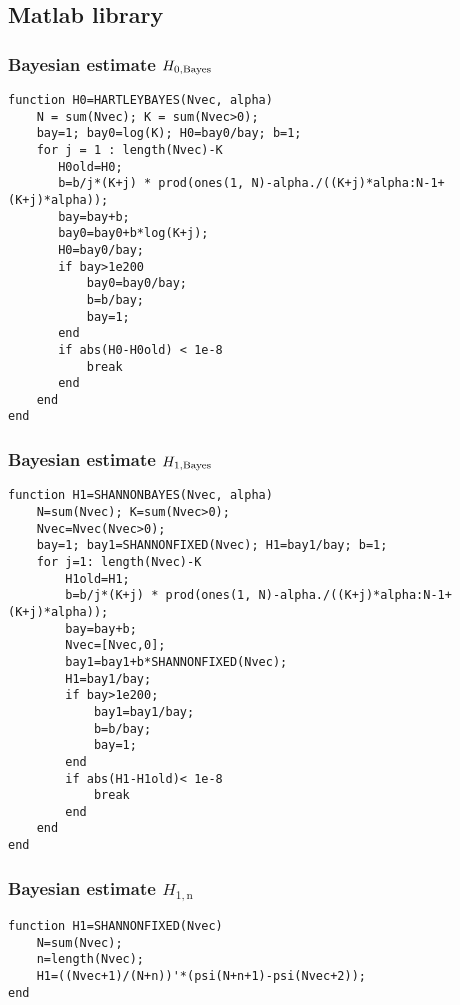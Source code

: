 \subsection{Matlab library}

\subsubsection{Bayesian estimate $ H_{0,\mbox{\scriptsize{Bayes}}}$ }
\ttfamily
\begin{lstlisting}
function H0=HARTLEYBAYES(Nvec, alpha) 
    N = sum(Nvec); K = sum(Nvec>0);        
    bay=1; bay0=log(K); H0=bay0/bay; b=1;
    for j = 1 : length(Nvec)-K
       H0old=H0;   
       b=b/j*(K+j) * prod(ones(1, N)-alpha./((K+j)*alpha:N-1+(K+j)*alpha));
       bay=bay+b;
       bay0=bay0+b*log(K+j);
       H0=bay0/bay;
       if bay>1e200
           bay0=bay0/bay;
           b=b/bay;
           bay=1;           
       end
       if abs(H0-H0old) < 1e-8
           break
       end
    end
end
\end{lstlisting}

\normalfont
\subsubsection{Bayesian estimate $ H_{1,\mbox{\scriptsize{Bayes}}}$ }
\ttfamily
\begin{lstlisting}
function H1=SHANNONBAYES(Nvec, alpha)
    N=sum(Nvec); K=sum(Nvec>0);
    Nvec=Nvec(Nvec>0);
    bay=1; bay1=SHANNONFIXED(Nvec); H1=bay1/bay; b=1;
    for j=1: length(Nvec)-K
        H1old=H1;
        b=b/j*(K+j) * prod(ones(1, N)-alpha./((K+j)*alpha:N-1+(K+j)*alpha));
        bay=bay+b;
        Nvec=[Nvec,0];
        bay1=bay1+b*SHANNONFIXED(Nvec);
        H1=bay1/bay;
        if bay>1e200;
            bay1=bay1/bay;
            b=b/bay;
            bay=1;
        end
        if abs(H1-H1old)< 1e-8
            break
        end
    end
end
\end{lstlisting}

\normalfont
\subsubsection{Bayesian estimate $ H_{1,\text{n}}$ }
\ttfamily
\begin{lstlisting}
function H1=SHANNONFIXED(Nvec)
	N=sum(Nvec);
	n=length(Nvec);
	H1=((Nvec+1)/(N+n))'*(psi(N+n+1)-psi(Nvec+2));
end
\end{lstlisting}

\normalfont
\ttfamily
\begin{lstlisting}

\end{lstlisting}


